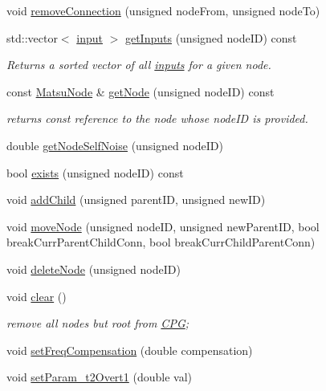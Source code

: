 \begin{DoxyCompactItemize}
void \mbox{\hyperlink{classCPG_ab2c84c91fc9de378a6ed0a29305244cc}{remove\+Connection}} (unsigned node\+From, unsigned node\+To)
\item 
std\+::vector$<$ \mbox{\hyperlink{structCPG_1_1input}{input}} $>$ \mbox{\hyperlink{classCPG_a78702e3e28d7d70f4a4da93fe4aa2840}{get\+Inputs}} (unsigned node\+ID) const
\begin{DoxyCompactList}\small\item\em Returns a sorted vector of all \mbox{\hyperlink{structCPG_1_1input}{inputs}} for a given node. \end{DoxyCompactList}\item 
const \mbox{\hyperlink{classMatsuNode}{Matsu\+Node}} \& \mbox{\hyperlink{classCPG_a1c35e3f15f24e2017bb4db7d3ac62a35}{get\+Node}} (unsigned node\+ID) const
\begin{DoxyCompactList}\small\item\em returns const reference to the node whose node\+ID is provided. \end{DoxyCompactList}\item 
double \mbox{\hyperlink{classCPG_ad3ddf0fa097221f855e5f52fc6ec01bc}{get\+Node\+Self\+Noise}} (unsigned node\+ID)
\item 
bool \mbox{\hyperlink{classCPG_afa2ec0b75b84e9f089f82045d08dbb31}{exists}} (unsigned node\+ID) const
\item 
void \mbox{\hyperlink{classCPG_a1a182a410afd8e3b76cb16d99ddef541}{add\+Child}} (unsigned parent\+ID, unsigned new\+ID)
\item 
void \mbox{\hyperlink{classCPG_a052ebefc34a7b11931b49136d7642584}{move\+Node}} (unsigned node\+ID, unsigned new\+Parent\+ID, bool break\+Curr\+Parent\+Child\+Conn, bool break\+Curr\+Child\+Parent\+Conn)
\item 
void \mbox{\hyperlink{classCPG_a4926078d71fc86b7cec29faa43b16d8e}{delete\+Node}} (unsigned node\+ID)
\item 
void \mbox{\hyperlink{classCPG_a7b9beb05a9681c34d99509018dda8739}{clear}} ()
\begin{DoxyCompactList}\small\item\em remove all nodes but root from \mbox{\hyperlink{classCPG}{C\+PG}}; \end{DoxyCompactList}\item 
void \mbox{\hyperlink{classCPG_a6a7d9249a73865d230b9f0308965705e}{set\+Freq\+Compensation}} (double compensation)
\item 
void \mbox{\hyperlink{classCPG_a67c0d2d6de22109fe467f4e05c0a37b9}{set\+Param\+\_\+t2\+Overt1}} (double val)

\end{DoxyCompactItemize}
